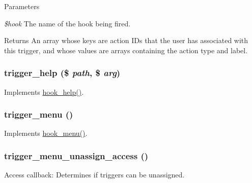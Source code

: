 \begin{DoxyParams}{Parameters}
\item[{\em \$hook}]The name of the hook being fired.\end{DoxyParams}
\begin{DoxyReturn}{Returns}
An array whose keys are action IDs that the user has associated with this trigger, and whose values are arrays containing the action type and label. 
\end{DoxyReturn}
\hypertarget{trigger_8module_acf35c233c08343f433206af894e2e0de}{
\subsubsection[{trigger\_\-help}]{\setlength{\rightskip}{0pt plus 5cm}trigger\_\-help (\$ {\em path}, \/  \$ {\em arg})}}
\label{trigger_8module_acf35c233c08343f433206af894e2e0de}
Implements \hyperlink{group__hooks_ga5589c2714a782738e8851c4c90231f0e}{hook\_\-help()}. \hypertarget{trigger_8module_a467708b4dec3a4e2c9eba80d0c94db3c}{
\subsubsection[{trigger\_\-menu}]{\setlength{\rightskip}{0pt plus 5cm}trigger\_\-menu ()}}
\label{trigger_8module_a467708b4dec3a4e2c9eba80d0c94db3c}
Implements \hyperlink{group__hooks_ga5c95244fea59b25666e409759e133ded}{hook\_\-menu()}. \hypertarget{trigger_8module_a813ac3e63770c93897b3978768717a40}{
\subsubsection[{trigger\_\-menu\_\-unassign\_\-access}]{\setlength{\rightskip}{0pt plus 5cm}trigger\_\-menu\_\-unassign\_\-access ()}}
\label{trigger_8module_a813ac3e63770c93897b3978768717a40}
Access callback: Determines if triggers can be unassigned.

